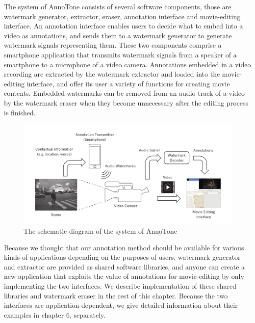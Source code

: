 The system of AnnoTone consists of several software components, those are watermark generator, extractor, eraser, annotation interface and movie-editing interface.
An annotation interface enables users to decide what to embed into a video as annotations, and sends them to a watermark generator to generate watermark signals representing them.
These two components comprise a smartphone application that transmits watermark signals from a speaker of a smartphone to a microphone of a video camera.
Annotations embedded in a video recording are extracted by the watermark extractor and loaded into the movie-editing interface, and offer its user a variety of functions for creating movie contents.
Embedded watermarks can be removed from an audio track of a video by the watermark eraser when they become unnecessary after the editing process is finished.

\begin{figure}[htbp]
 \begin{center}
  \vspace{5mm}
  \includegraphics[width=135mm]{overview.pdf}
 \end{center}
 \caption{The schematic diagram of the system of AnnoTone}
 \label{fig:one}
\end{figure}

Because we thought that our annotation method should be available for various kinds of applications depending on the purposes of users, watermark generator and extractor are provided as shared software libraries, and anyone can create a new application that exploits the value of annotations for movie-editing by only implementing the two interfaces.
We describe implementation of these shared libraries and watermark eraser in the rest of this chapter.
Because the two interfaces are application-dependent, we give detailed information about their examples in chapter 6, separately.